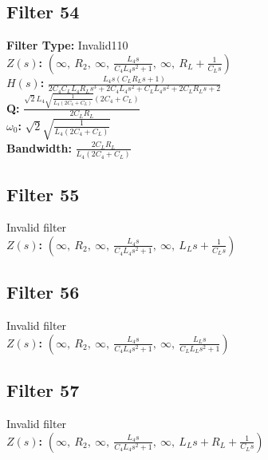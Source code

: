 \documentclass{article}
\begin{document}
\subsection*{Filter 54}
\textbf{Filter Type:} Invalid110 \\ 
\textbf{$Z(s)$:} $\left( \infty, \  R_{2}, \  \infty, \  \frac{L_{4} s}{C_{4} L_{4} s^{2} + 1}, \  \infty, \  R_{L} + \frac{1}{C_{L} s}\right)$ \\ 
\textbf{$H(s)$:} $\frac{L_{4} s \left(C_{L} R_{L} s + 1\right)}{2 C_{4} C_{L} L_{4} R_{L} s^{3} + 2 C_{4} L_{4} s^{2} + C_{L} L_{4} s^{2} + 2 C_{L} R_{L} s + 2}$ \\ 
\textbf{Q:} $\frac{\sqrt{2} L_{4} \sqrt{\frac{1}{L_{4} \left(2 C_{4} + C_{L}\right)}} \left(2 C_{4} + C_{L}\right)}{2 C_{L} R_{L}}$ \\ 
\textbf{$\omega_0$:} $\sqrt{2} \sqrt{\frac{1}{L_{4} \left(2 C_{4} + C_{L}\right)}}$ \\ 
\textbf{Bandwidth:} $\frac{2 C_{L} R_{L}}{L_{4} \left(2 C_{4} + C_{L}\right)}$ \\ 
\subsection*{Filter 55}
Invalid filter \\ 
\textbf{$Z(s)$:} $\left( \infty, \  R_{2}, \  \infty, \  \frac{L_{4} s}{C_{4} L_{4} s^{2} + 1}, \  \infty, \  L_{L} s + \frac{1}{C_{L} s}\right)$ \\ 
\subsection*{Filter 56}
Invalid filter \\ 
\textbf{$Z(s)$:} $\left( \infty, \  R_{2}, \  \infty, \  \frac{L_{4} s}{C_{4} L_{4} s^{2} + 1}, \  \infty, \  \frac{L_{L} s}{C_{L} L_{L} s^{2} + 1}\right)$ \\ 
\subsection*{Filter 57}
Invalid filter \\ 
\textbf{$Z(s)$:} $\left( \infty, \  R_{2}, \  \infty, \  \frac{L_{4} s}{C_{4} L_{4} s^{2} + 1}, \  \infty, \  L_{L} s + R_{L} + \frac{1}{C_{L} s}\right)$ \\ 
\end{document}

